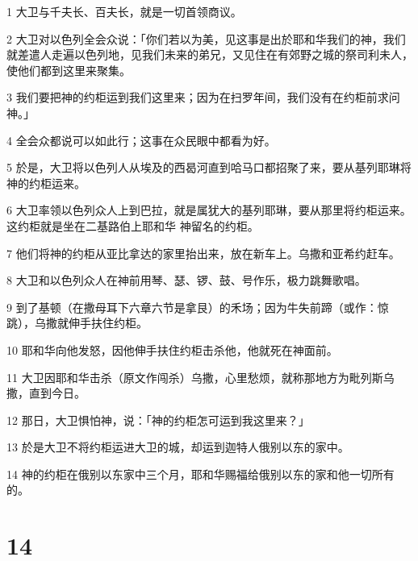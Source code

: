 \par 1 大卫与千夫长、百夫长，就是一切首领商议。
\par 2 大卫对以色列全会众说：「你们若以为美，见这事是出於耶和华我们的神，我们就差遣人走遍以色列地，见我们未来的弟兄，又见住在有郊野之城的祭司利未人，使他们都到这里来聚集。
\par 3 我们要把神的约柜运到我们这里来；因为在扫罗年间，我们没有在约柜前求问神。」
\par 4 全会众都说可以如此行；这事在众民眼中都看为好。
\par 5 於是，大卫将以色列人从埃及的西曷河直到哈马口都招聚了来，要从基列耶琳将神的约柜运来。
\par 6 大卫率领以色列众人上到巴拉，就是属犹大的基列耶琳，要从那里将约柜运来。这约柜就是坐在二基路伯上耶和华 神留名的约柜。
\par 7 他们将神的约柜从亚比拿达的家里抬出来，放在新车上。乌撒和亚希约赶车。
\par 8 大卫和以色列众人在神前用琴、瑟、锣、鼓、号作乐，极力跳舞歌唱。
\par 9 到了基顿（在撒母耳下六章六节是拿艮）的禾场；因为牛失前蹄（或作：惊跳），乌撒就伸手扶住约柜。
\par 10 耶和华向他发怒，因他伸手扶住约柜击杀他，他就死在神面前。
\par 11 大卫因耶和华击杀（原文作闯杀）乌撒，心里愁烦，就称那地方为毗列斯乌撒，直到今日。
\par 12 那日，大卫惧怕神，说：「神的约柜怎可运到我这里来？」
\par 13 於是大卫不将约柜运进大卫的城，却运到迦特人俄别以东的家中。
\par 14 神的约柜在俄别以东家中三个月，耶和华赐福给俄别以东的家和他一切所有的。

\chapter{14}


